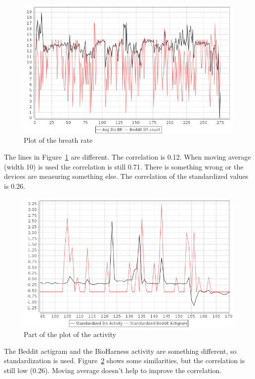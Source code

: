 			\begin{figure}[h]
				\centering
					\includegraphics[scale=0.5]{vsbr.png}
					
				\caption{Plot of the breath rate}
				\label{fig:vsbr}

			\end{figure}

			The lines in Figure~\ref{fig:vsbr} are different. The correlation is 0.12. When moving average (width 10) is used the correlation is still 0.71. There is something wrong or the devices are measuring something else. The correlation of the standardized values is 0.26. 
						
			\begin{figure}[h]
				\centering
					\includegraphics[scale=0.5]{vsactivity.png}
					
				\caption{Part of the plot of the activity}
				\label{fig:vsactivity}

			\end{figure}
			The Beddit actigram and the BioHarness activity are something different, so standardization is used. Figure~\ref{fig:vsactivity} shows some similarities, but the correlation is still low (0.26). Moving average doesn't help to improve the correlation.

